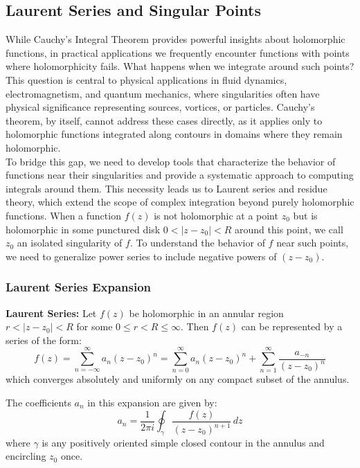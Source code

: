 \subsection*{Laurent Series and Singular Points}  

\noindent While Cauchy's Integral Theorem provides powerful insights about holomorphic functions, in practical applications we frequently encounter functions with points where holomorphicity fails. What happens when we integrate around such points? This question is central to physical applications in fluid dynamics, electromagnetism, and quantum mechanics, where singularities often have physical significance representing sources, vortices, or particles. Cauchy's theorem, by itself, cannot address these cases directly, as it applies only to holomorphic functions integrated along contours in domains where they remain holomorphic. \\

\noindent To bridge this gap, we need to develop tools that characterize the behavior of functions near their singularities and provide a systematic approach to computing integrals around them. This necessity leads us to Laurent series and residue theory, which extend the scope of complex integration beyond purely holomorphic functions. When a function $f(z)$ is not holomorphic at a point $z_0$ but is holomorphic in some punctured disk $0 < |z - z_0| < R$ around this point, we call $z_0$ an isolated singularity of $f$. To understand the behavior of $f$ near such points, we need to generalize power series to include negative powers of $(z - z_0)$.

\subsubsection*{Laurent Series Expansion} 

\noindent \textbf{Laurent Series:} Let $f(z)$ be holomorphic in an annular region $r < |z - z_0| < R$ for some $0 \leq r < R \leq \infty$. Then $f(z)$ can be represented by a series of the form:
\[
f(z) = \sum_{n=-\infty}^{\infty} a_n (z - z_0)^n = \sum_{n=0}^{\infty} a_n (z - z_0)^n + \sum_{n=1}^{\infty} \frac{a_{-n}}{(z - z_0)^n}
\]
which converges absolutely and uniformly on any compact subset of the annulus.

\noindent The coefficients $a_n$ in this expansion are given by:
\[
a_n = \frac{1}{2\pi i} \oint_\gamma \frac{f(z)}{(z - z_0)^{n+1}} \, dz
\]
where $\gamma$ is any positively oriented simple closed contour in the annulus and encircling $z_0$ once.

